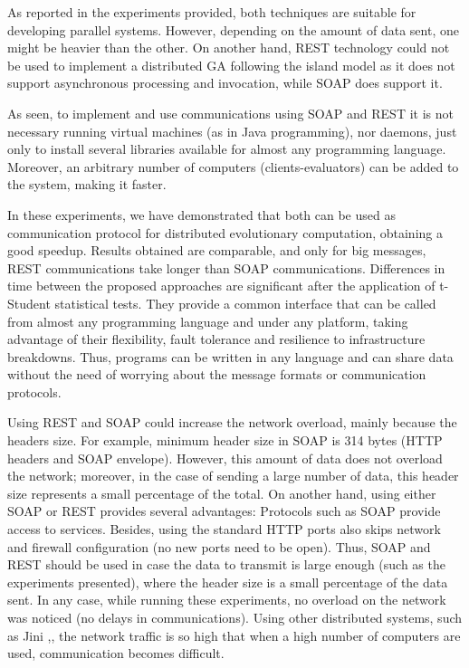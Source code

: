 \documentclass[final,1p,times]{elsarticle}
\begin{document}
As reported in the experiments provided, both techniques are suitable for developing parallel systems.
However, depending on the amount of data sent, one might be heavier than the other.
On another hand, REST technology could not be used to implement a distributed GA following the island model as it does not support asynchronous processing and invocation, while SOAP does support it.

As seen, to implement and use communications using SOAP and REST it is not necessary running virtual machines (as in Java programming), nor daemons, just only to install several libraries available for almost any programming language.
Moreover, an arbitrary number of computers (clients-evaluators) can be added to the system, making it faster.

In these experiments, we have demonstrated that both can be used as communication protocol for distributed evolutionary computation, obtaining a good speedup.
Results obtained are comparable, and only for big messages, REST communications take longer than SOAP communications.
Differences in time between the proposed approaches are significant after the application of t-Student statistical tests.
They provide a common interface that can be called from almost any programming language and under any platform, taking advantage of their flexibility, fault tolerance and resilience to infrastructure breakdowns.
Thus, programs can be written in any language and can share data without the need of worrying about the message formats or communication protocols. 


Using REST and SOAP could increase the network overload, mainly because the headers size. 
For example, minimum header size in SOAP is 314 bytes (HTTP headers and SOAP envelope). 
However, this amount of data does not overload the network; moreover, in the case of sending a large number of data, this header size represents a small percentage of the total. 
On another hand, using either SOAP or REST provides several advantages: Protocols such as SOAP provide access to services. Besides, using the standard HTTP ports also skips network and firewall configuration (no new ports need to be open). Thus, SOAP and REST should be used in case the data to transmit is large enough (such as the experiments presented), where the header size is a small percentage of the data sent.
In any case, while running these experiments, no overload on the network was noticed (no delays in communications).
Using other distributed systems, such as Jini \cite{jiniFAQ},\cite{Jini:FEA2000}, the network traffic is so high that when a high number of computers are used, communication becomes difficult.
\end{document}
